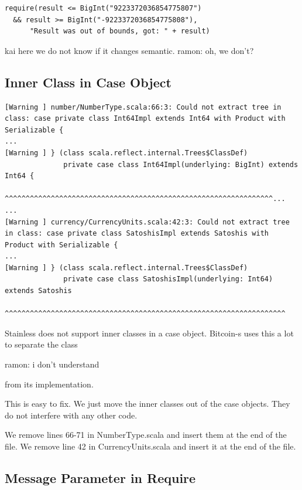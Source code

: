 \documentclass[runningheads]{llncs}
\newcommand{\todo}[1]{{\par \color{red}#1}}
\begin{document}
\begin{lstlisting}[style=scala]
require(result <= BigInt("9223372036854775807")  
  && result >= BigInt("-9223372036854775808"),
      "Result was out of bounds, got: " + result)
\end{lstlisting}


\todo{kai here we do not know if it changes semantic. ramon: oh, we don't?}



\subsection{Inner Class in Case Object}

\begin{lstlisting}[style=stainless]
[Warning ] number/NumberType.scala:66:3: Could not extract tree in class: case private class Int64Impl extends Int64 with Product with Serializable {
...
[Warning ] } (class scala.reflect.internal.Trees$ClassDef)
              private case class Int64Impl(underlying: BigInt) extends Int64 {
              ^^^^^^^^^^^^^^^^^^^^^^^^^^^^^^^^^^^^^^^^^^^^^^^^^^^^^^^^^^^^^^^^...
...
[Warning ] currency/CurrencyUnits.scala:42:3: Could not extract tree in class: case private class SatoshisImpl extends Satoshis with Product with Serializable {
...
[Warning ] } (class scala.reflect.internal.Trees$ClassDef)
              private case class SatoshisImpl(underlying: Int64) extends Satoshis
              ^^^^^^^^^^^^^^^^^^^^^^^^^^^^^^^^^^^^^^^^^^^^^^^^^^^^^^^^^^^^^^^^^^^
\end{lstlisting}

Stainless does not support inner classes in a case object. Bitcoin-s
uses this a lot to separate the class \todo{ramon: i don't understand} from its implementation.

This is easy to fix. We just move the inner classes out of the case objects. They do
not interfere with any other code.

We remove lines 66-71 in NumberType.scala and insert them at the end of the file.
We remove line 42 in CurrencyUnits.scala and insert it at the end of the file.


\subsection{Message Parameter in Require}
\end{document}
